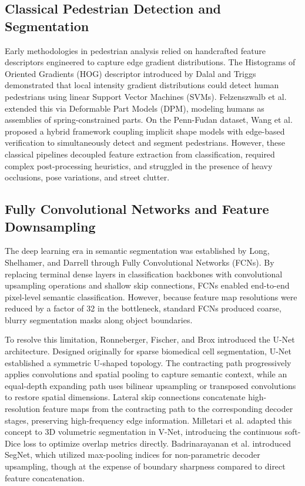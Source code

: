 \documentclass[10pt,a4paper]{article}
\begin{document}
\subsection{Classical Pedestrian Detection and Segmentation}
Early methodologies in pedestrian analysis relied on handcrafted feature descriptors engineered to capture edge gradient distributions. The Histograms of Oriented Gradients (HOG) descriptor introduced by Dalal and Triggs \cite{dalal2005histograms} demonstrated that local intensity gradient distributions could detect human pedestrians using linear Support Vector Machines (SVMs). Felzenszwalb et al. \cite{felzenszwalb2009object} extended this via Deformable Part Models (DPM), modeling humans as assemblies of spring-constrained parts. On the Penn-Fudan dataset, Wang et al. \cite{wang2007object} proposed a hybrid framework coupling implicit shape models with edge-based verification to simultaneously detect and segment pedestrians. However, these classical pipelines decoupled feature extraction from classification, required complex post-processing heuristics, and struggled in the presence of heavy occlusions, pose variations, and street clutter.

\subsection{Fully Convolutional Networks and Feature Downsampling}
The deep learning era in semantic segmentation was established by Long, Shelhamer, and Darrell \cite{long2015fully} through Fully Convolutional Networks (FCNs). By replacing terminal dense layers in classification backbones with convolutional upsampling operations and shallow skip connections, FCNs enabled end-to-end pixel-level semantic classification. However, because feature map resolutions were reduced by a factor of 32 in the bottleneck, standard FCNs produced coarse, blurry segmentation masks along object boundaries.

To resolve this limitation, Ronneberger, Fischer, and Brox \cite{ronneberger2015unet} introduced the U-Net architecture. Designed originally for sparse biomedical cell segmentation, U-Net established a symmetric U-shaped topology. The contracting path progressively applies convolutions and spatial pooling to capture semantic context, while an equal-depth expanding path uses bilinear upsampling or transposed convolutions to restore spatial dimensions. Lateral skip connections concatenate high-resolution feature maps from the contracting path to the corresponding decoder stages, preserving high-frequency edge information. Milletari et al. \cite{milletari2016vnet} adapted this concept to 3D volumetric segmentation in V-Net, introducing the continuous soft-Dice loss to optimize overlap metrics directly. Badrinarayanan et al. \cite{badrinarayanan2017segnet} introduced SegNet, which utilized max-pooling indices for non-parametric decoder upsampling, though at the expense of boundary sharpness compared to direct feature concatenation.
\end{document}

